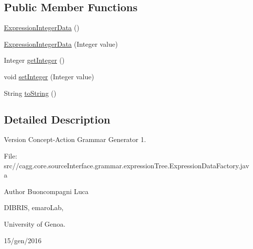\subsection*{Public Member Functions}
\begin{DoxyCompactItemize}
\item 
\hyperlink{classit_1_1emarolab_1_1cagg_1_1core_1_1language_1_1syntax_1_1expressionTree_1_1ExpressionDataFactory_1_1ExpressionIntegerData_a01bd35022670e709458e7900cbe20f6c}{Expression\-Integer\-Data} ()
\item 
\hyperlink{classit_1_1emarolab_1_1cagg_1_1core_1_1language_1_1syntax_1_1expressionTree_1_1ExpressionDataFactory_1_1ExpressionIntegerData_a7b23433ba7e3cbefabd9f735e55adf37}{Expression\-Integer\-Data} (Integer value)
\item 
Integer \hyperlink{classit_1_1emarolab_1_1cagg_1_1core_1_1language_1_1syntax_1_1expressionTree_1_1ExpressionDataFactory_1_1ExpressionIntegerData_a1ccc1240353d658055b9d4779c2c6645}{get\-Integer} ()
\item 
void \hyperlink{classit_1_1emarolab_1_1cagg_1_1core_1_1language_1_1syntax_1_1expressionTree_1_1ExpressionDataFactory_1_1ExpressionIntegerData_ad7df4501feac9be2798ab2642c138bcf}{set\-Integer} (Integer value)
\item 
String \hyperlink{classit_1_1emarolab_1_1cagg_1_1core_1_1language_1_1syntax_1_1expressionTree_1_1ExpressionDataFactory_1_1ExpressionIntegerData_a4710b9db3724323b940bb633bf8e70b6}{to\-String} ()
\end{DoxyCompactItemize}


\subsection{Detailed Description}
\begin{DoxyVersion}{Version}
Concept-\/\-Action Grammar Generator 1. \par
 File\-: src//cagg.core.\-source\-Interface.\-grammar.\-expression\-Tree.\-Expression\-Data\-Factory.\-java \par

\end{DoxyVersion}
\begin{DoxyAuthor}{Author}
Buoncompagni Luca \par
 D\-I\-B\-R\-I\-S, emaro\-Lab,\par
 University of Genoa. \par
 15/gen/2016 \par

\end{DoxyAuthor}


